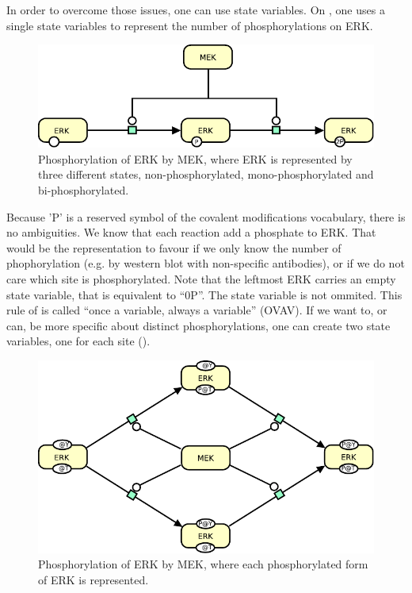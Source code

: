 In order to overcome those issues, one can use state variables. On , one uses a single state variables to represent the number of phosphorylations on ERK. 

\begin{figure}[htb]
  \centering
  \includegraphics[scale = 1]{le_images/MAPK-OneVar}
  \caption{Phosphorylation of ERK by MEK, where ERK is represented by three different states, non-phosphorylated, mono-phosphorylated and bi-phosphorylated.}
  \label{fig:MAPK-OneVar}
\end{figure}

Because 'P' is a reserved symbol of the covalent modifications vocabulary, there is no ambiguities. We know that each reaction add a phosphate to ERK. That would be the representation to favour if we only know the number of phophorylation (e.g. by western blot with non-specific antibodies), or if we do not care which site is phosphorylated. Note that the leftmost ERK carries an empty state variable, that is equivalent to ``0P''. The state variable is not ommited. This rule of \SBGNPDLone is called ``once a variable, always a variable'' (OVAV).
If we want to, or can, be more specific about distinct phosphorylations, one can create two state variables, one for each site (). 

\begin{figure}[htb]
  \centering
  \includegraphics[scale = 1]{le_images/MAPK-TwoVar}
  \caption{Phosphorylation of ERK by MEK, where each phosphorylated form of ERK is represented.}
  \label{fig:MAPK-TwoVar}
\end{figure}

